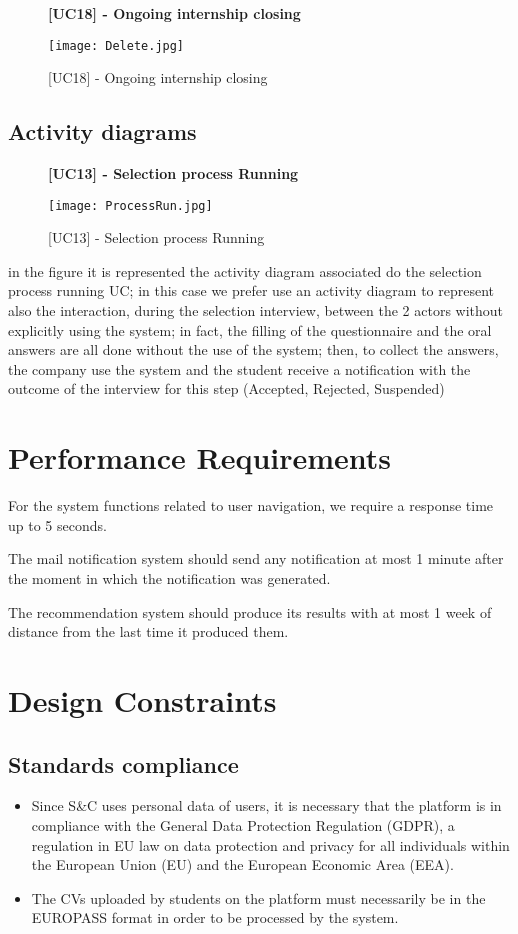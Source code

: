 			\begin{figure}[H]
				\centering
				{\bfseries [UC18] - Ongoing internship closing}
				\caption{[UC18] - Ongoing internship closing}
				\texttt{[image: Delete.jpg]}
				
			\end{figure}
			
		\subsection{Activity diagrams}
		
			\begin{figure}[H]
				\centering
				{\bfseries [UC13] - Selection process Running}
				\caption{[UC13] - Selection process Running}
				\texttt{[image: ProcessRun.jpg]}
				
			\end{figure}
			
			in the figure it is represented the activity diagram associated do the selection process running UC; in this case we prefer use an activity diagram to represent also the interaction, during the selection interview, between the 2 actors without explicitly using the system; in fact, the filling of the questionnaire and the oral answers are all done without the use of the system; then, to collect the answers, the company use the system and the student receive a notification with the outcome of the interview for this step (Accepted, Rejected, Suspended)
		
	\section{Performance Requirements}
		For the system functions related to user navigation, we require a response time up to 5 seconds.
		
		The mail notification system should send any notification at most 1 minute after the moment in which the notification was generated.
		
		The recommendation system should produce its results with at most 1 week of distance from the last time it produced them.
	\section{Design Constraints}
		\subsection{Standards compliance}
			\begin{itemize}
				\item Since S\&C uses personal data of users, it is necessary that the platform is in compliance with the General Data 		 Protection 	Regulation (GDPR), a regulation in EU law on data protection and privacy for all individuals within the European Union (EU) and the European Economic Area (EEA).
				
				\item The CVs uploaded by students on the platform must necessarily be in the EUROPASS format in order to be processed by the system.
			\end{itemize}
			
